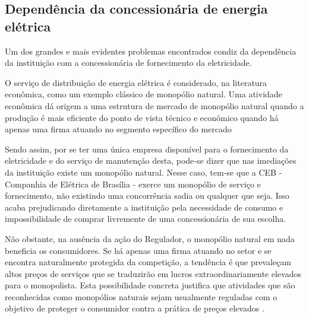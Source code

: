 \subsection{Dependência da concessionária de energia elétrica}
Um dos grandes e mais evidentes problemas encontrados condiz da dependência da instituição com a concessionária de fornecimento da eletricidade.
\par O serviço de distribuição de energia elétrica é considerado, na literatura econômica, como um exemplo clássico de monopólio natural. Uma atividade econômica dá origem a uma estrutura de mercado de monopólio natural quando a produção é mais eficiente do ponto de vista técnico e econômico quando há apenas uma firma atuando no segmento específico do mercado \cite{ramos2012porque}
\par Sendo assim, por se ter uma única empresa disponível para o fornecimento da eletricidade e do serviço de manutenção desta, pode-se dizer que nas imediações da instituição existe um monopólio natural. Nesse caso, tem-se que a CEB - Companhia de Elétrica de Brasília - exerce um monopólio de serviço e fornecimento, não existindo uma concorrência sadia ou qualquer que seja. Isso acaba prejudicando diretamente a instituição pela necessidade de consumo e impossibilidade de comprar livremente de uma concessionária de sua escolha.
\par Não obstante, na ausência da ação do Regulador, o monopólio natural em nada beneficia os consumidores. Se há apenas uma firma atuando no setor e se encontra naturalmente protegida da competição, a tendência é que prevaleçam altos preços de serviços que se traduzirão em lucros extraordinariamente elevados para o monopolista. Esta possibilidade concreta justifica que atividades que são reconhecidas como monopólios naturais sejam usualmente reguladas com o objetivo de proteger o consumidor contra a prática de preços elevados \cite{ramos2012porque}.